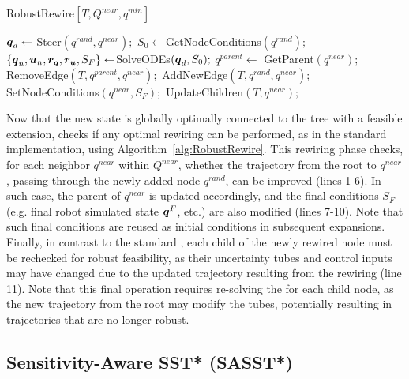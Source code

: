 \begin{algorithm}[h!]
    \caption{RobustRewire$[T, Q^{near}, q^{min}]$}\label{alg:RobustRewire}
    \begin{algorithmic}[1]
            \State $\boldsymbol{q}_d \gets$ Steer$(q^{rand}, q^{near});$
            \State $S_0 \gets $GetNodeConditions$({q^{rand}});$
            \State $\left \{\boldsymbol{q}_n, \boldsymbol{u}_n, \boldsymbol{r_q}, \boldsymbol{r_u}, S_F \right \}  \gets $SolveODEs$(\boldsymbol{q}_d, S_0);$
                    \State $q^{parent} \gets$ GetParent$(q^{near});$
                    \State RemoveEdge$(T, q^{parent}, q^{near});$
                    \State AddNewEdge$(T, q^{rand}, q^{near});$
                    \State SetNodeConditions$(q^{near}, S_{F});$
                    \State UpdateChildren$(T, q^{near});$
                \EndIf
            \EndIf
        \EndFor
    \end{algorithmic}
\end{algorithm}

Now that the new state is globally optimally connected to the tree with a feasible extension,  checks if any optimal rewiring can be performed, as in the standard  implementation, using Algorithm~\ref{alg:RobustRewire}.
This rewiring phase checks, for each neighbor $q^{near}$ within $Q^{near}$, whether the trajectory from the root to $q^{near}$, passing through the newly added node $q^{rand}$, can be improved (lines 1-6).
In such case, the parent of $q^{near}$ is updated accordingly, and the final  conditions $S_F$ (e.g. final robot simulated state $\boldsymbol{q}^F$, etc.) are also modified (lines 7-10).
Note that such final conditions are reused as initial conditions in subsequent expansions.
Finally, in contrast to the standard , each child of the newly rewired node must be rechecked for robust feasibility, as their uncertainty tubes and control inputs may have changed due to the updated trajectory resulting from the rewiring (line 11).
Note that this final operation requires re-solving the  for each child node, as the new trajectory from the root may modify the tubes, potentially resulting in trajectories that are no longer robust.

\subsection{Sensitivity-Aware SST* (SASST*)}\label{sec:sasst*}

